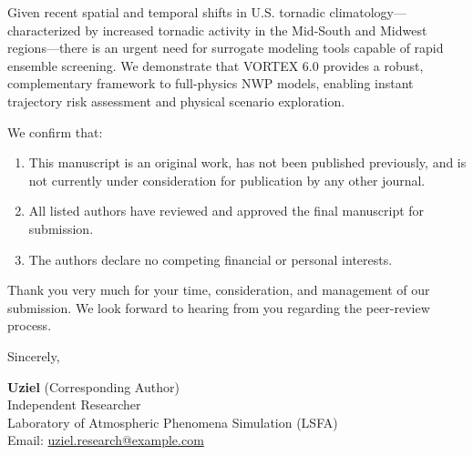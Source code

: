 \documentclass[11pt, a4paper]{article}
\begin{document}
Given recent spatial and temporal shifts in U.S. tornadic climatology---characterized by increased tornadic activity in the Mid-South and Midwest regions---there is an urgent need for surrogate modeling tools capable of rapid ensemble screening. We demonstrate that VORTEX 6.0 provides a robust, complementary framework to full-physics NWP models, enabling instant trajectory risk assessment and physical scenario exploration.

We confirm that:
\begin{enumerate}
    \item This manuscript is an original work, has not been published previously, and is not currently under consideration for publication by any other journal.
    \item All listed authors have reviewed and approved the final manuscript for submission.
    \item The authors declare no competing financial or personal interests.
\end{enumerate}

Thank you very much for your time, consideration, and management of our submission. We look forward to hearing from you regarding the peer-review process.

\vspace{0.8cm}

Sincerely,

\vspace{0.5cm}

\textbf{Uziel} (Corresponding Author) \\
Independent Researcher \\
Laboratory of Atmospheric Phenomena Simulation (LSFA) \\
Email: \href{mailto:uziel.research@example.com}{uziel.research@example.com}
\end{document}
